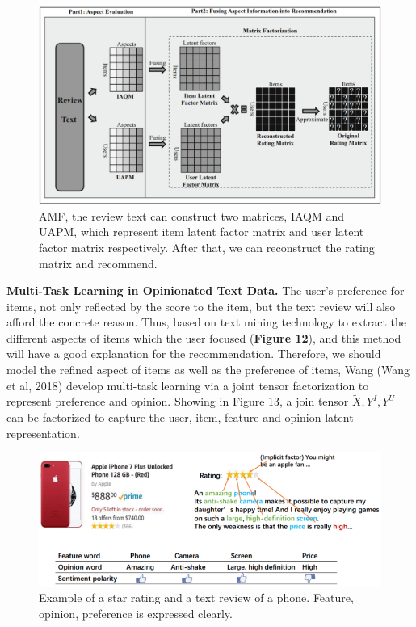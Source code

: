 \documentclass[10pt,twocolumn,letterpaper]{article}
\begin{document}
\begin{figure}
	\begin{center}
		\includegraphics[width=0.8\linewidth]{EFM.png}
	\end{center}
	\caption{AMF, the review text can construct two matrices, IAQM and UAPM, which represent item latent factor matrix and user latent factor matrix respectively. After that, we can reconstruct the rating matrix and recommend.}
	\label{fig:long}
	\label{fig:onecol}
\end{figure}

{\bf Multi-Task Learning in Opinionated Text Data.} The user's preference for items, not only reflected by the score to the item, but the text review will also afford the concrete reason. Thus, based on text mining technology to extract the different aspects of items which the user focused ({\bf Figure 12}), and this method will have a good explanation for the recommendation. Therefore, we should model the refined aspect of items as well as the preference of items, Wang (Wang et al, 2018) develop multi-task learning via a joint tensor factorization to represent preference and opinion. Showing in {Figure 13}, a join tensor $\tilde{X}, Y^I, Y^U$ can be factorized to capture the user, item, feature and opinion latent representation.

\begin{figure}
	\begin{center}
		\includegraphics[width=0.8\linewidth]{multi_task_1.png}
	\end{center}
	\caption{Example of a star rating and a text review of a phone. Feature, opinion, preference is expressed clearly.}
	\label{fig:long}
	\label{fig:onecol}
\end{figure}
\end{document}
